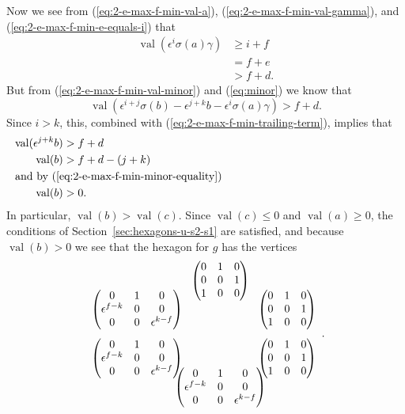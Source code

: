 \documentclass{amsart}
\theoremstyle{definition}
\def\e{\epsilon}
\def\val{\mathop{\mathrm{val}}}
\def\s{\sigma}
\def\heximages#1#2#3#4#5#6{
  \heximagessqueezedcarefully{1.7em}{-1em}{#1}{#2}{#3}{#4}{#5}{#6}
}
\def\heximagessqueezedcarefully#1#2#3#4#5#6#7#8{
  \begin{array}{ccc}
    & #3 & \\[#2]
    #5 \hspace{-#1} & & \hspace{-#1} #4 \\[2em]
    #6 \hspace{-#1} & & \hspace{-#1} #7 \\[#2]
    & #8 &
  \end{array}
}
\begin{document}
  Now we see from (\ref{eq:2-e-max-f-min-val-a}),
  (\ref{eq:2-e-max-f-min-val-gamma}), and
  (\ref{eq:2-e-max-f-min-e-equals-i}) that
  \begin{align}
    \val(\e^i\s(a)\gamma) &\ge i + f \nonumber \\
    &= f + e \nonumber \\
    \label{eq:2-e-max-f-min-trailing-term}
    &> f + d.
  \end{align}
  But from (\ref{eq:2-e-max-f-min-val-minor}) and (\ref{eq:minor}) we know that
  \begin{equation*}
    \val(\e^{i+j}\s(b) - \e^{j+k}b - \e^i\s(a)\gamma) > f + d.
  \end{equation*}
  Since $i > k$, this, combined with
  (\ref{eq:2-e-max-f-min-trailing-term}), implies that
  \begin{align}
    \val(\e^{j+k}b) &> f + d \nonumber \\
    \val(b) &> f + d - (j + k) \\
    \noalign{\noindent and by (\ref{eq:2-e-max-f-min-minor-equality})}
    \label{eq:2-e-max-f-min-val-b}
    \val(b) &> 0.
  \end{align}
  In particular, $\val(b) > \val(c)$.  Since $\val(c) \le 0$ and $\val(a) \ge
  0$, the conditions of Section~\ref{sec:hexagons-u-s2-s1} are satisfied, and
  because $\val(b) > 0$ we see that the hexagon for $g$ has the vertices
  \begin{equation*}
   \heximages
       {\begin{pmatrix}
           0 & 1 & 0 \\
           0 & 0 & 1 \\
           1 & 0 & 0
       \end{pmatrix}}
       {\begin{pmatrix}
           0 & 1 & 0 \\
           0 & 0 & 1 \\
           1 & 0 & 0
       \end{pmatrix}}
       {\begin{pmatrix}
           0 & 1 & 0 \\
           \e^{f-k} & 0 & 0 \\
           0 & 0 & \e^{k-f}
       \end{pmatrix}}
       {\begin{pmatrix}
           0 & 1 & 0 \\
           \e^{f-k} & 0 & 0 \\
           0 & 0 & \e^{k-f}
       \end{pmatrix}}
       {\begin{pmatrix}
           0 & 1 & 0 \\
           0 & 0 & 1 \\
           1 & 0 & 0
       \end{pmatrix}}
       {\begin{pmatrix}
           0 & 1 & 0 \\
           \e^{f-k} & 0 & 0 \\
           0 & 0 & \e^{k-f}
       \end{pmatrix}}.
  \end{equation*}
\end{document}
